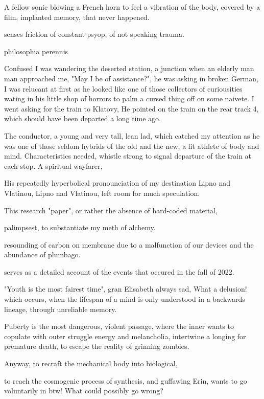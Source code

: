 \documentclass{article}
\begin{document}
A fellow sonic blowing a French horn to feel a vibration of the body, 
covered by a film, implanted memory, that never happened. 

senses
friction of constant psyop, of not speaking trauma. 


philosophia perennis


Confused I was wandering the deserted station, 
a junction   
when an elderly man man approached me, "May I be of assistance?", he was asking in broken German,
I was relucant at first as he looked like one of those collectors of curiousities wating in his little shop of horrors to palm a cursed thing off on some naivete.
I went asking for the train to Klatovy, He pointed on the train on the rear track 4, which should have been departed a long time ago. 

The conductor, a young and very tall, lean lad, which catched my attention as he was one of those seldom hybrids of the old and the new, a fit athlete of body and mind. Characteristics needed, whistle strong
to signal departure of the train at each stop.
A spiritual wayfarer, 

His repeatedly hyperbolical pronounciation of my destination 
Lipno nad Vlatinou, Lipno nad Vlatinou, left room for much speculation.









This research "paper", 
or rather the absence of hard-coded material,  

palimpsest, to substantiate my meth of alchemy. 

resounding of carbon on membrane due to a
malfunction of our devices and the
abundance of plumbago. 

serves as a detailed account
of the events that occured in the fall of 2022.

"Youth is the most fairest time", gran Elisabeth always sad, 
What a delusion! 
which occurs, when the lifespan of a mind is only understood in a backwards lineage,
through unreliable memory.

Puberty is the most dangerous, violent passage, 
where the inner wants to copulate with outer struggle 
energy and melancholia, intertwine
a longing for premature death, to escape the reality of 
grinning zombies.

Anyway, to recraft the mechanical body into biological,

to reach the cosmogenic process of synthesis, 
and guffawing Erin, 
wants to go voluntarily in btw! What could possibly go wrong?
\end{document}
